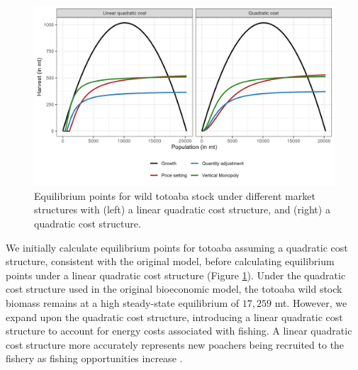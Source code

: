 \begin{figure}[h]
    \centering
    \includegraphics[width=0.85\linewidth]{figures/totoaba/Figure3.png}
    \caption{Equilibrium points for wild totoaba stock under different market structures with (left) a linear quadratic cost structure, and (right) a quadratic cost structure.}
    \label{fig:figure4}
\end{figure}

We initially calculate equilibrium points for totoaba assuming a quadratic cost structure, consistent with the original model, before calculating equilibrium points under a linear quadratic cost structure (Figure \ref{fig:figure4}). Under the quadratic cost structure used in the original bioeconomic model, the totoaba wild stock biomass remains at a high steady-state equilibrium of $17,259$ mt. However, we expand upon the quadratic cost structure, introducing a linear quadratic cost structure to account for energy costs associated with fishing. A linear quadratic cost structure more accurately represents new poachers being recruited to the fishery as fishing opportunities increase \citep{pereau_triple_2012, clark_worldwide_2007}.

